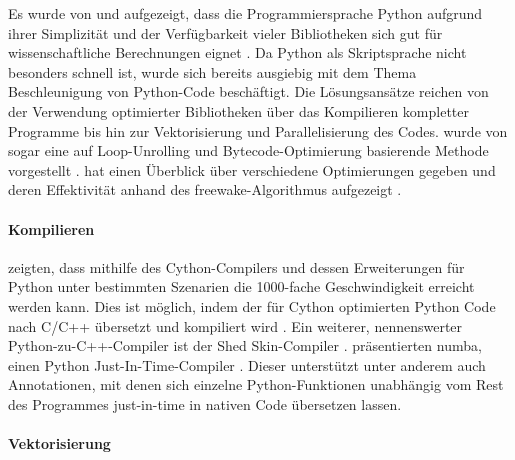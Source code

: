 Es wurde von \citeauthor{Oli07} und \citeauthor{PGH11} aufgezeigt, dass die Programmiersprache Python aufgrund ihrer Simplizität und der Verfügbarkeit vieler Bibliotheken sich gut für wissenschaftliche Berechnungen eignet \cite{Oli07,PGH11}. Da Python als Skriptsprache nicht besonders schnell ist, wurde sich bereits ausgiebig mit dem Thema Beschleunigung von Python-Code beschäftigt. Die Lösungsansätze reichen von der Verwendung optimierter Bibliotheken über das Kompilieren kompletter Programme bis hin zur Vektorisierung und Parallelisierung des Codes. \citeyear{BR09} wurde von \citeauthor{BR09} sogar eine auf Loop-Unrolling und Bytecode-Optimierung basierende Methode vorgestellt \cite{BR09}.
\citeauthor{Ill14} hat \citeyear{Ill14} einen Überblick über verschiedene Optimierungen gegeben und deren Effektivität anhand des freewake-Algorithmus aufgezeigt \cite{Ill14}.

\paragraph{Kompilieren}

\citeauthor{BBC+11} zeigten, dass mithilfe des Cython-Compilers und dessen Erweiterungen für Python unter bestimmten Szenarien die 1000-fache Geschwindigkeit erreicht werden kann. Dies ist möglich, indem der für Cython optimierten Python Code nach C/C++ übersetzt und kompiliert wird \cite{BBC+11}. Ein weiterer, nennenswerter Python-zu-C++-Compiler ist der Shed Skin-Compiler \cite{Mar09}. \citeauthor{LPS15} präsentierten \citeyear{LPS15} numba, einen Python Just-In-Time-Compiler \cite{LPS15}. Dieser unterstützt unter anderem auch Annotationen, mit denen sich einzelne Python-Funktionen unabhängig vom Rest des Programmes just-in-time in nativen Code übersetzen lassen. 

\paragraph{Vektorisierung}

